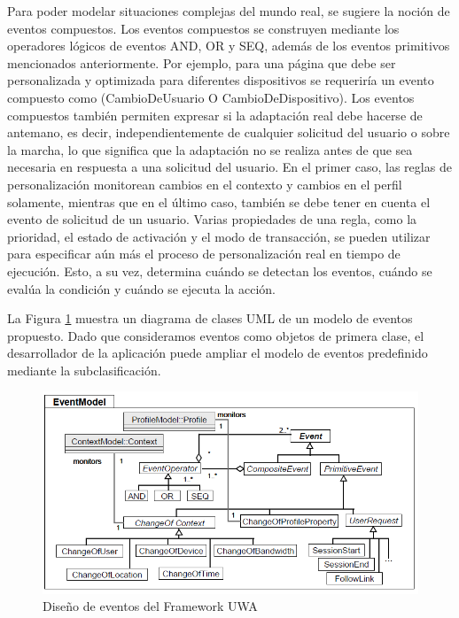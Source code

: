 Para poder modelar situaciones complejas del mundo real, se sugiere la noción de eventos compuestos. Los eventos compuestos se construyen mediante los operadores lógicos de eventos AND, OR y SEQ, además de los eventos primitivos mencionados anteriormente. Por ejemplo, para una página que debe ser personalizada y optimizada para diferentes dispositivos se requeriría un evento compuesto como (CambioDeUsuario O CambioDeDispositivo). Los eventos compuestos también permiten expresar si la adaptación real debe hacerse de antemano, es decir, independientemente de cualquier solicitud del usuario o sobre la marcha, lo que significa que la adaptación no se realiza antes de que sea necesaria en respuesta a una solicitud del usuario. En el primer caso, las reglas de personalización monitorean cambios en el contexto y cambios en el perfil solamente, mientras que en el último caso, también se debe tener en cuenta el evento de solicitud de un usuario. Varias propiedades de una regla, como la prioridad, el estado de activación y el modo de transacción, se pueden utilizar para especificar aún más el proceso de personalización real en tiempo de ejecución. Esto, a su vez, determina cuándo se detectan los eventos, cuándo se evalúa la condición y cuándo se ejecuta la acción.

La Figura \ref{uwaFramewor} muestra un diagrama de clases UML de un modelo de eventos propuesto. Dado que consideramos eventos como objetos de primera clase, el desarrollador de la aplicación puede ampliar el modelo de eventos predefinido mediante la subclasificación.

\begin{figure}[h]
\begin{center}
 \includegraphics[width=4 in,totalheight=3 in]
{Ch1/Figuras/UWAEventModel.png}
\caption{Diseño de eventos del Framework UWA}\label{uwaFramewor}
\end{center}
\end{figure}



